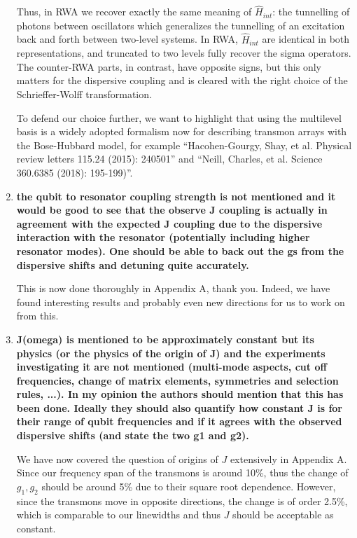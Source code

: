 \documentclass{article}
\begin{document}
\begin{enumerate}
	Thus, in RWA we recover exactly the same meaning of $\hat H_{int}$: the tunnelling of photons between oscillators which generalizes the tunnelling of an excitation back and forth between two-level systems. In RWA,  $\hat H_{int}$ are identical in both representations, and truncated to two levels fully recover the sigma operators. The counter-RWA parts, in contrast, have opposite signs, but this only matters for the dispersive coupling and is cleared with the right choice of the Schrieffer-Wolff transformation.
	
	To defend our choice further, we want to highlight that using the multilevel basis is a widely adopted formalism now for describing transmon arrays with the Bose-Hubbard model, for example ``Hacohen-Gourgy, Shay, et al. Physical review letters 115.24 (2015): 240501'' and  ``Neill, Charles, et al. Science 360.6385 (2018): 195-199)''.
	
	
	\item \textbf{the qubit to resonator coupling strength is not mentioned and it
		would be good to see that the observe J coupling is actually in
		agreement with the expected J coupling due to the dispersive
		interaction with the resonator (potentially including higher resonator
		modes). One should be able to back out the gs from the dispersive
		shifts and detuning quite accurately.}
	
	This is now done thoroughly in Appendix A, thank you. Indeed, we have found interesting results and probably even new directions for us to work on from this.

	\item \textbf{J(omega) is mentioned to be approximately constant but its physics
	(or the physics of the origin of J) and the experiments investigating
	it are not mentioned (multi-mode aspects, cut off frequencies, change
		of matrix elements, symmetries and selection rules, ...). In my
		opinion the authors should mention that this has been done. Ideally
		they should also quantify how constant J is for their range of qubit
		frequencies and if it agrees with the observed dispersive shifts (and
		state the two g1 and g2).}
	
	We have now covered the question of origins of $J$ extensively in Appendix A. Since our frequency span of the transmons is around 10\%, thus the change of $g_1, g_2$ should be around 5\% due to their square root dependence. However, since the transmons move in opposite directions, the change is of order 2.5\%, which is comparable to our linewidths and thus $J$ should be acceptable as constant.
	

\end{enumerate}
\end{document}
